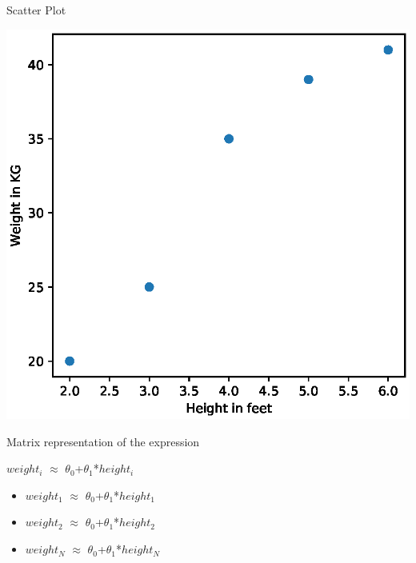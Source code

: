 \documentclass{beamer}
\begin{document}
\begin{frame}{Scatter Plot}
\begin{center}
        \includegraphics[totalheight=6cm]{linear-reg/height-weight-scatterplot.eps}
        

        
\end{center}


\end{frame}

\begin{frame}{Matrix representation of the expression}
\begin{center}
\begin{tcolorbox}
$weight_{i}$ $\approx$
$\theta_{0}$+$\theta_{1}$*$height_{i}$
\end{tcolorbox}
\end{center}

\begin{itemize}
\item $weight_{1}$ $\approx$
$\theta_{0}$+$\theta_{1}$*$height_{1}$

\item $weight_{2}$ $\approx$
$\theta_{0}$+$\theta_{1}$*$height_{2}$


\item $weight_{N}$ $\approx$
$\theta_{0}$+$\theta_{1}$*$height_{N}$

\end{itemize}
\end{frame}
\end{document}
